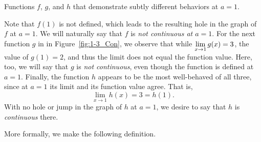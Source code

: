 \begin{marginfigure} %
\captionsetup[subfigure]{labelformat=empty}


\caption{Functions $f$, $g$, and $h$ that demonstrate subtly different behaviors at $a = 1$.}
\label{fig:1-3_Con}
\end{marginfigure}

Note that  $f(1)$ is not defined, which leads to the resulting hole in the graph of $f$ at $a = 1$.  We will naturally say that $f$ is \emph{not continuous at $a = 1$}.  For the next function $g$ in in Figure~\ref{fig:1-3_Con}, we observe that while $\displaystyle \lim_{x \to 1} g(x) = 3$, the value of $g(1) = 2$, and thus the limit does not equal the function value.  Here, too, we will say that $g$ is \emph{not continuous}, even though the function is defined at $a = 1$.  Finally, the function $h$ appears to be the most well-behaved of all three, since at $a = 1$ its limit and its function value agree.  That is,
\[ \lim_{x \to 1} h(x) = 3 = h(1). \]
With no hole or jump in the graph of $h$ at $a = 1$, we desire to say that $h$ is \emph{continuous} there.

More formally, we make the following definition.


